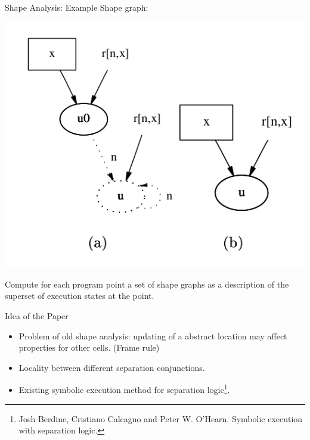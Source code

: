 \documentclass[aspectratio=1610, 13pt]{beamer}
\begin{document}
\begin{frame}{Shape Analysis: Example}
    Shape graph: 
\begin{center}
    \includegraphics[scale=0.4]{shape_graph.png}
\end{center}
Compute for each program point a set of shape graphs as a description of the superset of execution states at the point.

\end{frame}

\begin{frame}{Idea of the Paper}
    
    
    
    
    \begin{itemize}
        \item Problem of old shape analysis: updating of a abstract location may affect properties for other cells. (Frame rule)
        \item Locality between different separation conjunctions.
        \item Existing symbolic execution method for separation logic\footnote{Josh Berdine, Cristiano Calcagno and Peter W. O’Hearn. Symbolic execution with separation logic.}.
    \end{itemize}
\end{frame}
\end{document}
